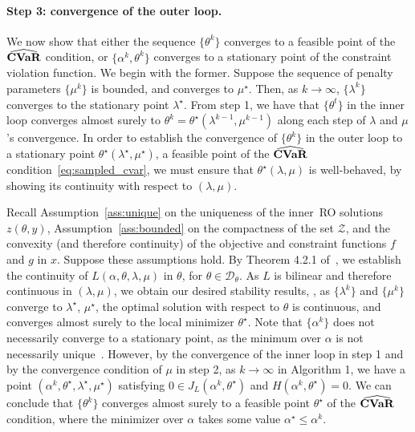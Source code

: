 \documentclass[11pt]{article}
\begin{document}
\begin{appendices}
\paragraph{Step 3: convergence of the outer loop.}
We now show that either the sequence $\{\theta^k\}$ converges to a feasible point of the $\widehat{\mathop{\bf CVaR}}$ condition, or $\{\alpha^k,\theta^k\}$
converges to a stationary point of the constraint violation function. 
We begin with the former. 
Suppose the sequence of penalty parameters $\{\mu^k\}$ is bounded, and converges to $\mu^\star$.
Then, as $k \to \infty$, $\{\lambda^k\}$ converges to the stationary point $\lambda^\star$.
From step 1, we have that $\{\theta^t\} $ in the inner loop converges almost surely to $\theta^k = \theta^\star(\lambda^{k-1},\mu^{k-1})$ along each step of $\lambda$ and $\mu$'s convergence. 
In order to establish the convergence of $\{\theta^k \}$ in the outer loop to a stationary point $\theta^\star(\lambda^\star, \mu^\star)$,  a feasible point of the $\widehat{\mathop{\bf CVaR}}$ condition~\eqref{eq:sampled_cvar}, we must ensure that $\theta^\star(\lambda, \mu)$ is well-behaved, by showing its continuity with respect to $(\lambda, \mu)$.



Recall Assumption~\ref{ass:unique} on the uniqueness of the inner~\gls{RO} solutions $z(\theta,y)$, Assumption~\ref{ass:bounded} on the compactness of the set $\mathcal{Z}$, and the convexity (and therefore continuity) of the objective and constraint functions $f$ and $g$ in $x$. Suppose these assumptions hold. By Theorem 4.2.1 of~\cite{parametric_stability}, we establish the continuity of $L(\alpha,\theta,\lambda,\mu)$ in $\theta$, for $\theta \in \mathcal{D}_\theta$. As $L$ is bilinear and therefore continuous in $(\lambda, \mu)$, we obtain our desired stability results, \ie, as $\{\lambda^k\}$ and $\{\mu^k\}$ converge to $\lambda^\star$, $\mu^\star$, the optimal solution with respect to $\theta$ is continuous, and converges almost surely to the local minimizer $\theta^\star$. 
Note that $\{\alpha^k\}$ does not necessarily converge to a stationary point, as the minimum over $\alpha$ is not necessarily unique~\cite[Theorem 2]{cvaropt}.
However, by the convergence of the inner loop in step 1 and by the convergence condition of $\mu$ in step 2, as $k\to \infty$ in Algorithm 1, we have a point $(\alpha^k,\theta^\star,\lambda^\star,\mu^\star)$ satisfying $0 \in J_L(\alpha^k,\theta^\star)$ and $H(\alpha^k,\theta^\star) = 0$.  
We can conclude that $ \{\theta^k\}$ converges almost surely to 
a feasible point  $\theta^\star$ of the $\widehat{\mathop{\bf CVaR}}$ condition, where the minimizer over $\alpha$ takes some value $\alpha^\star \leq \alpha^k$.



\end{appendices}
\end{document}
